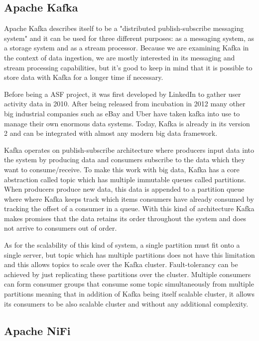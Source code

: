 \subsection{Apache Kafka}

Apache Kafka describes itself to be a "distributed publish-subscribe messaging system" and it can be used for three different purposes: as a messaging system, as a storage system and as a stream processor. \cite{kafka}
Because we are examining Kafka in the context of data ingestion, we are mostly interested in its messaging and stream processing capabilities, but it's good to keep in mind that it is possible to store data with Kafka for a longer time if necessary.

Before being a ASF project, it was first developed by LinkedIn to gather user activity data in 2010. \cite{ramalingeswara}
After being released from incubation in 2012 many other big industrial companies such as eBay and Uber \cite{yuan} have taken kafka into use to manage their own enormous data systems.
Today, Kafka is already in its version 2 and can be integrated with almost any modern big data framework. \cite{ramalingeswara}

Kafka operates on publish-subscribe architecture where producers input data into the system by producing data and consumers subscribe to the data which they want to consume/receive.
To make this work with big data, Kafka has a core abstraction called topic which has multiple immutable queues called partitions.
When producers produce new data, this data is appended to a partition queue where where Kafka keeps track which items consumers have already consumed by tracking the offset of a consumer in a queue.
With this kind of architecture Kafka makes promises that the data retains its order throughout the system and does not arrive to consumers out of order.

As for the scalability of this kind of system, a single partition must fit onto a single server, but topic which has multiple partitions does not have this limitation and this allows topics to scale over the Kafka cluster.
Fault-tolerancy can be achieved by just replicating these partitions over the cluster.
Multiple consumers can form consumer groups that consume some topic simultaneously from multiple partitions meaning that in addition of Kafka being itself scalable cluster, it allows its consumers to be also scalable cluster and without any additional complexity. \cite{kafka}

\subsection{Apache NiFi}


